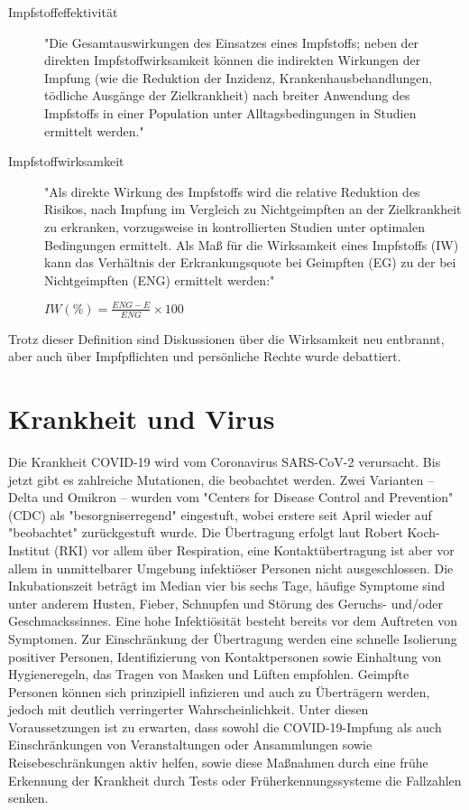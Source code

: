 \begin{description}
    \item[Impfstoffeffektivität] "Die Gesamtauswirkungen des Einsatzes eines Impfstoffs; neben der direkten Impfstoffwirksamkeit können die indirekten Wirkungen der Impfung (wie die Reduktion der Inzidenz, Krankenhausbehandlungen, tödliche Ausgänge der Zielkrankheit) nach breiter Anwendung des Impfstoffs in einer Population unter Alltagsbedingungen in Studien ermittelt werden."

    \item[Impfstoffwirksamkeit] "Als direkte Wirkung des Impfstoffs wird die relative Reduktion des Risikos, nach Impfung im Vergleich zu Nichtgeimpften an der Zielkrankheit zu erkranken, vorzugsweise in kontrollierten Studien unter optimalen Bedingungen ermittelt. Als Maß für die Wirksamkeit eines Impfstoffs (IW) kann das Verhältnis der Erkrankungsquote bei Geimpften (EG) zu der bei Nichtgeimpften (ENG) ermittelt werden:"
    
    $IW(\%) = \frac{ENG-E}{ENG} \times 100$
\end{description}

Trotz dieser Definition sind Diskussionen über die Wirksamkeit neu entbrannt, aber auch über Impfpflichten und persönliche Rechte wurde debattiert.

\section{Krankheit und Virus}
\label{sec:virusinfo}
Die Krankheit COVID-19 wird vom Coronavirus SARS-CoV-2 verursacht. Bis jetzt gibt es zahlreiche Mutationen, die beobachtet werden. Zwei Varianten -- Delta und Omikron -- wurden vom "Centers for Disease Control and Prevention" (CDC) als "besorgniserregend" eingestuft, wobei erstere seit April wieder auf "beobachtet" zurückgestuft wurde. \cite{cdc-classification}
Die Übertragung erfolgt laut Robert Koch-Institut (RKI) vor allem über Respiration, eine Kontaktübertragung ist aber vor allem in unmittelbarer Umgebung infektiöser Personen nicht ausgeschlossen. Die Inkubationszeit beträgt im Median vier bis sechs Tage, häufige Symptome sind unter anderem Husten, Fieber, Schnupfen und Störung des Geruchs- und/oder Geschmackssinnes. Eine hohe Infektiösität besteht bereits vor dem Auftreten von Symptomen. Zur Einschränkung der Übertragung werden eine schnelle Isolierung positiver Personen, Identifizierung von Kontaktpersonen sowie Einhaltung von Hygieneregeln, das Tragen von Masken und Lüften empfohlen. Geimpfte Personen können sich prinzipiell infizieren und auch zu Überträgern werden, jedoch mit deutlich verringerter Wahrscheinlichkeit. \cite{rki}
Unter diesen Voraussetzungen ist zu erwarten, dass sowohl die COVID-19-Impfung als auch Einschränkungen von Veranstaltungen oder Ansammlungen sowie Reisebeschränkungen aktiv helfen, sowie diese Maßnahmen durch eine frühe Erkennung der Krankheit durch Tests oder Früherkennungssysteme die Fallzahlen senken.


